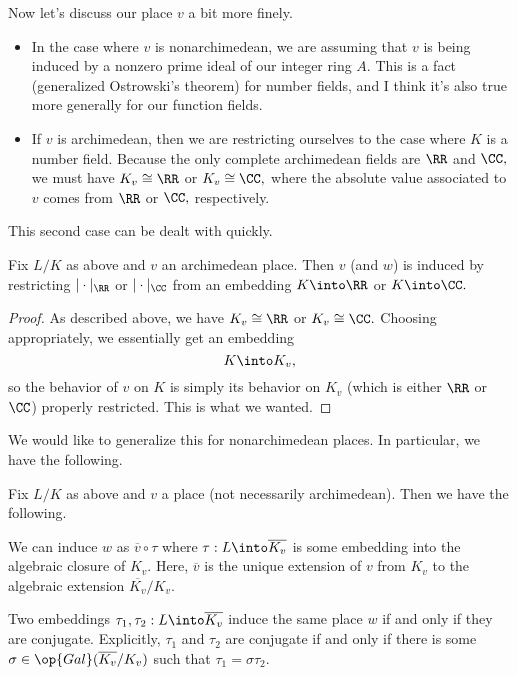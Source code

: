 Now let's discuss our place $v$ a bit more finely.
\begin{itemize}
	\item In the case where $v$ is nonarchimedean, we are assuming that $v$ is being induced by a nonzero prime ideal of our integer ring $A.$ This is a fact (generalized Ostrowski's theorem) for number fields, and I think it's also true more generally for our function fields.
	\item If $v$ is archimedean, then we are restricting ourselves to the case where $K$ is a number field. Because the only complete archimedean fields are $\RR$ and $\CC,$ we must have $K_v\cong\RR$ or $K_v\cong\CC,$ where the absolute value associated to $v$ comes from $\RR$ or $\CC,$ respectively.
\end{itemize}
This second case can be dealt with quickly.
\begin{prop}
	Fix $L/K$ as above and $v$ an archimedean place. Then $v$ (and $w$) is induced by restricting $|\cdot|_\RR$ or $|\cdot|_\CC$ from an embedding $K\into\RR$ or $K\into\CC.$
\end{prop}
\begin{proof}
	As described above, we have $K_v\cong\RR$ or $K_v\cong\CC.$ Choosing appropriately, we essentially get an embedding
	\[K\into K_v,\]
	so the behavior of $v$ on $K$ is simply its behavior on $K_v$ (which is either $\RR$ or $\CC$) properly restricted. This is what we wanted.
\end{proof}
We would like to generalize this for nonarchimedean places. In particular, we have the following.
\begin{theorem}[Extension]
	Fix $L/K$ as above and $v$ a place (not necessarily archimedean). Then we have the following.
	\begin{listalph}
		\item We can induce $w$ as $\overline v\circ\tau$ where $\tau:L\into\overline{K_v}$ is some embedding into the algebraic closure of $K_v.$ Here, $\overline v$ is the unique extension of $v$ from $K_v$ to the algebraic extension $\overline{K_v}/K_v.$
		\item Two embeddings $\tau_1,\tau_2:L\into\overline{K_v}$ induce the same place $w$ if and only if they are conjugate. Explicitly, $\tau_1$ and $\tau_2$ are conjugate if and only if there is some $\sigma\in\op{Gal}(\overline{K_v}/K_v)$ such that $\tau_1=\sigma\tau_2.$
	\end{listalph}
\end{theorem}
